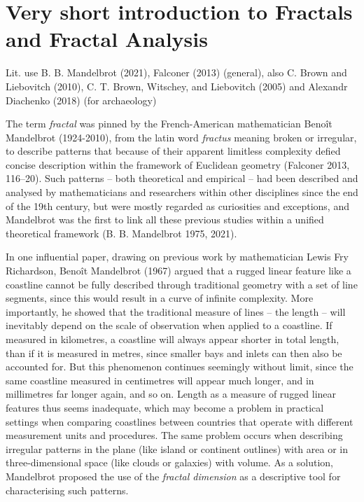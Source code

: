 \documentclass[
  12pt,
  a4paper, twoside]{book}
\begin{document}
\hypertarget{fractals}{%
\section{Very short introduction to Fractals and Fractal Analysis}\label{fractals}}

Lit. use B. B. Mandelbrot (2021), Falconer (2013) (general), also C. Brown and Liebovitch (2010), C. T. Brown, Witschey, and Liebovitch (2005) and Alexandr Diachenko (2018) (for archaeology)

The term \emph{fractal} was pinned by the French-American mathematician Benoît Mandelbrot (1924-2010), from the latin word \emph{fractus} meaning broken or irregular, to describe patterns that because of their apparent limitless complexity defied concise description within the framework of Euclidean geometry (Falconer 2013, 116--20). Such patterns -- both theoretical and empirical -- had been described and analysed by mathematicians and researchers within other disciplines since the end of the 19th century, but were mostly regarded as curiosities and exceptions, and Mandelbrot was the first to link all these previous studies within a unified theoretical framework (B. B. Mandelbrot 1975, 2021).

In one influential paper, drawing on previous work by mathematician Lewis Fry Richardson, Benoît Mandelbrot (1967) argued that a rugged linear feature like a coastline cannot be fully described through traditional geometry with a set of line segments, since this would result in a curve of infinite complexity. More importantly, he showed that the traditional measure of lines -- the length -- will inevitably depend on the scale of observation when applied to a coastline. If measured in kilometres, a coastline will always appear shorter in total length, than if it is measured in metres, since smaller bays and inlets can then also be accounted for. But this phenomenon continues seemingly without limit, since the same coastline measured in centimetres will appear much longer, and in millimetres far longer again, and so on. Length as a measure of rugged linear features thus seems inadequate, which may become a problem in practical settings when comparing coastlines between countries that operate with different measurement units and procedures. The same problem occurs when describing irregular patterns in the plane (like island or continent outlines) with area or in three-dimensional space (like clouds or galaxies) with volume. As a solution, Mandelbrot proposed the use of the \emph{fractal dimension} as a descriptive tool for characterising such patterns.
\end{document}
